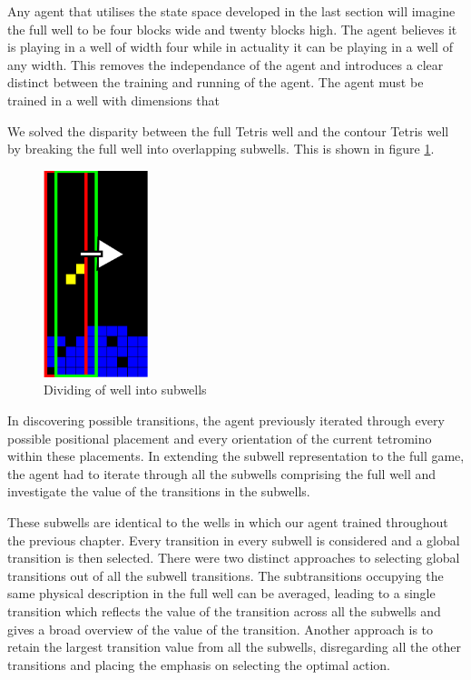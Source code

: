 \documentclass{rucsthesis}
\begin{document}
Any agent that utilises the state space developed in the last section will imagine the full well to be four blocks wide and twenty blocks high.  The agent believes it is playing in a well of width four while in actuality it can be playing in a well of any width. This removes the independance of the agent and introduces a clear distinct between the training and running of the agent. The agent must be trained in a well with dimensions that 

We solved the disparity between the full Tetris well and the contour Tetris well by breaking the full well into overlapping subwells. This is shown in figure \ref{fig:subwells}.

\begin{figure}[h]
\centering
\includegraphics[width=1.2in]{decomposedwell.png}
\caption{Dividing of well into subwells}
\label{fig:subwells}
\end{figure}

In discovering possible transitions, the agent previously iterated through every possible positional placement and every orientation of the current tetromino within these placements. In extending the subwell representation to the full game, the agent had to iterate through all the subwells comprising the full well and investigate the value of the transitions in the subwells.

These subwells are identical to the wells in which our agent trained throughout the previous chapter. Every transition in every subwell is considered and a global transition is then selected. There were two distinct approaches to selecting global transitions out of all the subwell transitions. The subtransitions occupying the same physical description in the full well can be averaged, leading to a single transition which reflects the value of the transition across all the subwells and gives a broad overview of the value of the transition. Another approach is to retain the largest transition value from all the subwells, disregarding all the other transitions and placing the emphasis on selecting the optimal action.
\end{document}
